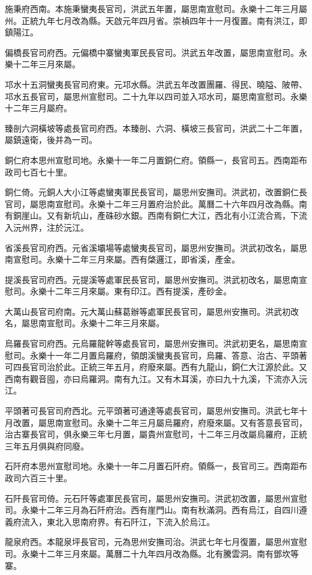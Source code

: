 施秉府西南。本施秉蠻夷長官司，洪武五年置，屬思南宣慰司。永樂十二年三月屬州。正統九年七月改為縣。天啟元年四月省。崇禎四年十一月復置。南有洪江，即鎮陽江。

偏橋長官司府西。元偏橋中寨蠻夷軍民長官司。洪武五年改置，屬思南宣慰司。永樂十二年三月來屬。

邛水十五洞蠻夷長官司府東。元邛水縣。洪武五年改置團羅、得民、曉隘、陂帶、邛水五長官司，屬思州宣慰司。二十九年以四司並入邛水司，屬思南宣慰司。永樂十二年三月屬府。

臻剖六洞橫坡等處長官司府西。本臻剖、六洞、橫坡三長官司，洪武二十二年置，屬鎮遠衛，後并為一司。

銅仁府本思州宣慰司地。永樂十一年二月置銅仁府。領縣一，長官司五。西南距布政司七百七十里。

銅仁倚。元銅人大小江等處蠻夷軍民長官司，屬思州安撫司。洪武初，改置銅仁長官司，屬思南宣慰司。永樂十二年三月置府治於此。萬曆二十六年四月改為縣。南有銅崖山。又有新坑山，產硃砂水銀。西南有銅仁大江，西北有小江流合焉，下流入沅州界，注於沅江。

省溪長官司府西。元省溪壩場等處蠻夷長官司，屬思州安撫司。洪武初改名，屬思南宣慰司。永樂十二年三月來屬。西有棨邏江，即省溪，產金。

提溪長官司府西。元提溪等處軍民長官司，屬思州安撫司。洪武初改名，屬思南宣慰司。永樂十二年三月來屬。東有印江。西有提溪，產砂金。

大萬山長官司府南。元大萬山蘇葛辦等處軍民長官司，屬思州安撫司。洪武初改名，屬思南宣慰司。永樂十二年三月來屬。

烏羅長官司府西。元烏羅龍幹等處長官司，屬思州安撫司。洪武初更名，屬思南宣慰司。永樂十一年二月置烏羅府，領朗溪蠻夷長官司，烏羅、答意、治古、平頭著可四長官司治於此。正統三年五月，府廢來屬。西有九龍山，銅仁大江源於此。又西南有觀音囤，亦曰烏羅洞。南有九江。又有木耳溪，亦曰九十九溪，下流亦入沅江。

平頭著可長官司府西北。元平頭著可通達等處長官司，屬思州安撫司。洪武七年十月改置，屬思南宣慰司。永樂十二年三月屬烏羅府，府廢來屬。又有答意長官司，治古寨長官司，俱永樂三年七月置，屬貴州宣慰司，十二年三月改屬烏羅府，正統三年五月俱與府同廢。

石阡府本思州宣慰司地。永樂十一年二月置石阡府。領縣一，長官司三。西南距布政司六百三十里。

石阡長官司倚。元石阡等處軍民長官司，屬思州安撫司。洪武初改置，屬思州宣慰司。永樂十二年三月為石阡府治。西有崖門山。南有秋滿洞。西有烏江，自四川遵義府流入，東北入思南府界。有石阡江，下流入於烏江。

龍泉府西。本龍泉坪長官司，元為思州安撫司治。洪武七年七月復置，屬思州宣慰司。永樂十二年三月來屬。萬曆二十九年四月改為縣。北有騰雲洞。南有鄧坎等寨。

